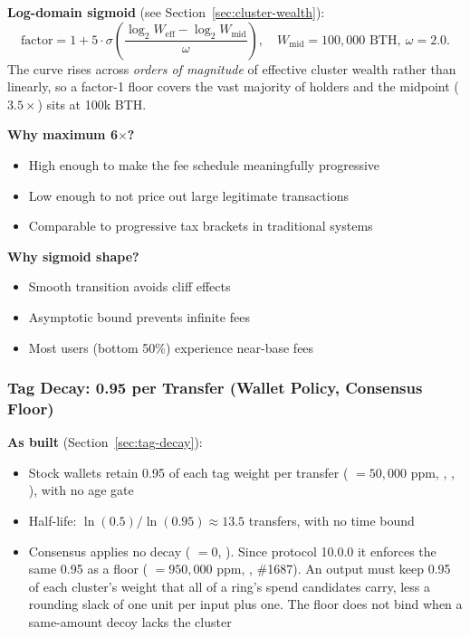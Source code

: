 \textbf{Log-domain sigmoid} (see Section~\ref{sec:cluster-wealth}):
\[
\text{factor} = 1 + 5 \cdot \sigma\!\left(\frac{\log_2 W_{\text{eff}} - \log_2 W_{\text{mid}}}{\omega}\right),
\quad W_{\text{mid}} = 100{,}000\text{ BTH},\ \omega = 2.0.
\]
The curve rises across \emph{orders of magnitude} of effective cluster wealth
rather than linearly, so a factor-1 floor covers the vast majority of holders
and the midpoint ($3.5\times$) sits at 100k BTH.

\textbf{Why maximum 6$\times$?}
\begin{itemize}
  \item High enough to make the fee schedule meaningfully progressive
  \item Low enough to not price out large legitimate transactions
  \item Comparable to progressive tax brackets in traditional systems
\end{itemize}

\textbf{Why sigmoid shape?}
\begin{itemize}
  \item Smooth transition avoids cliff effects
  \item Asymptotic bound prevents infinite fees
  \item Most users (bottom 50\%) experience near-base fees
\end{itemize}

\subsubsection{Tag Decay: 0.95 per Transfer (Wallet Policy, Consensus Floor)}

\textbf{As built} (Section~\ref{sec:tag-decay}):
\begin{itemize}
  \item Stock wallets retain 0.95 of each tag weight per transfer
    ( $= 50{,}000$ ppm,
    ,
    ,
    ), with no age gate
  \item Half-life: $\ln(0.5) / \ln(0.95) \approx 13.5$ transfers, with no
    time bound
  \item Consensus applies no decay (
    $= 0$, ). Since protocol 10.0.0 it
    enforces the same 0.95 as a floor
    ( $= 950{,}000$ ppm,
    , \#1687). An output must keep
    0.95 of each cluster's weight that all of a ring's spend candidates carry,
    less a rounding slack of one unit per input plus one. The floor does not
    bind when a same-amount decoy lacks the cluster
\end{itemize}


